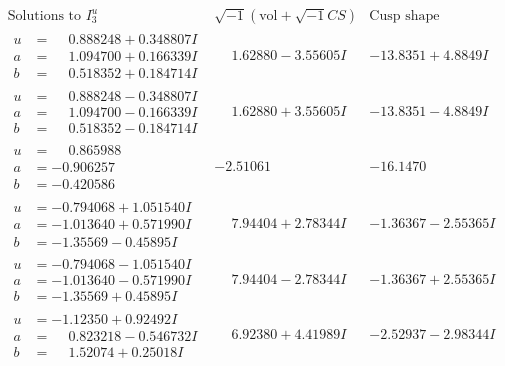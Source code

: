 \documentclass[1p]{elsarticle_modified}
\theoremstyle{definition}
\newcommand{\I}{\sqrt{-1}}
\begin{document}
$$\begin{array}{c|c|c}  
\text{Solutions to }I^u_{3}& \I (\text{vol} + \sqrt{-1}CS) & \text{Cusp shape}\\
 \hline 
\begin{aligned}
u &= \phantom{-}0.888248 + 0.348807 I \\
a &= \phantom{-}1.094700 + 0.166339 I \\
b &= \phantom{-}0.518352 + 0.184714 I\end{aligned}
 & \phantom{-}1.62880 - 3.55605 I & -13.8351 + 4.8849 I \\ \hline\begin{aligned}
u &= \phantom{-}0.888248 - 0.348807 I \\
a &= \phantom{-}1.094700 - 0.166339 I \\
b &= \phantom{-}0.518352 - 0.184714 I\end{aligned}
 & \phantom{-}1.62880 + 3.55605 I & -13.8351 - 4.8849 I \\ \hline\begin{aligned}
u &= \phantom{-}0.865988\phantom{ +0.000000I} \\
a &= -0.906257\phantom{ +0.000000I} \\
b &= -0.420586\phantom{ +0.000000I}\end{aligned}
 & -2.51061\phantom{ +0.000000I} & -16.1470\phantom{ +0.000000I} \\ \hline\begin{aligned}
u &= -0.794068 + 1.051540 I \\
a &= -1.013640 + 0.571990 I \\
b &= -1.35569 - 0.45895 I\end{aligned}
 & \phantom{-}7.94404 + 2.78344 I & -1.36367 - 2.55365 I \\ \hline\begin{aligned}
u &= -0.794068 - 1.051540 I \\
a &= -1.013640 - 0.571990 I \\
b &= -1.35569 + 0.45895 I\end{aligned}
 & \phantom{-}7.94404 - 2.78344 I & -1.36367 + 2.55365 I \\ \hline\begin{aligned}
u &= -1.12350 + 0.92492 I \\
a &= \phantom{-}0.823218 - 0.546732 I \\
b &= \phantom{-}1.52074 + 0.25018 I\end{aligned}
 & \phantom{-}6.92380 + 4.41989 I & -2.52937 - 2.98344 I \\ \hline\begin{aligned}

\end{aligned}
\end{array}$$
\end{document}
